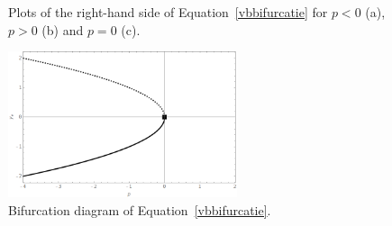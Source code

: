 \begin{example}
\begin{figure}[H]
\centerline{
\hspace{0.1cm}
\hspace{0.1cm}
}
\caption{Plots of the right-hand side of Equation~\eqref{vbbifurcatie} for $p<0$ (a), $p>0$ (b) and $p=0$ (c).} 
\label{vbbifurcatiefig}
\end{figure}

\begin{figure}[H]
	\begin{center}
			\includegraphics[width=0.6\textwidth]{vbbifurcatiediag}
	\caption{Bifurcation diagram of Equation~\eqref{vbbifurcatie}.}
	\label{vbbifurcatiediag}
	\end{center}
\end{figure}
\end{example}

